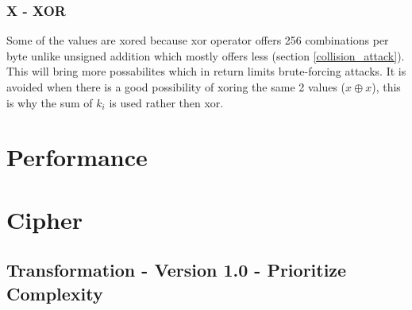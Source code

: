 \documentclass[fleqn, a4paper,12pt]{article}
\begin{document}
\subsubsection{X - XOR} %

Some of the values are xored because xor operator offers 256 combinations per byte unlike unsigned addition which mostly offers less (section \ref{collision_attack}). This will bring more possabilites which in return limits brute-forcing attacks. It is avoided when there is a good possibility of xoring the same 2 values ($x \oplus x$), this is why the sum of $k_i$ is used rather then xor.

\section{Performance}


\section {Cipher}

\subsection{Transformation - Version 1.0 - Prioritize Complexity}
\end{document}
